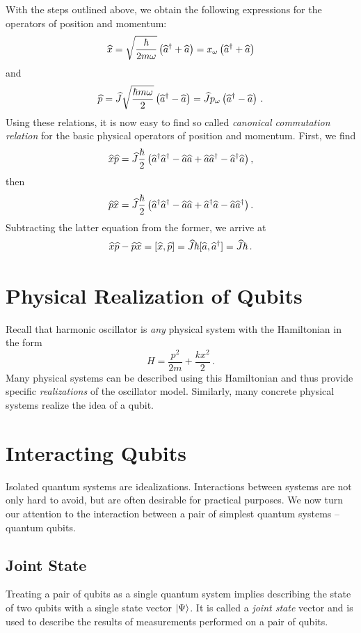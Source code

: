 With the steps outlined above, we obtain the following expressions for the operators of position and momentum:
\[
\widehat{x}=\sqrt{\frac{\hbar}{2m\omega}}\left(\widehat{a}^\dagger+\widehat{a}\right)=x_\omega\left(\widehat{a}^\dagger+\widehat{a}\right)
\]
and
\[
\widehat{p}=\widehat{J}\sqrt{\frac{\hbar m\omega}{2}}\left(\widehat{a}^\dagger-\widehat{a}\right)=\widehat{J} p_\omega\left(\widehat{a}^\dagger-\widehat{a}\right)\,.
\]
Using these relations, it is now easy to find so called \emph{canonical commutation relation} for the basic physical operators of position and momentum. First, we find
\[
\widehat{x}\widehat{p}=\widehat{J}\frac{\hbar}{2}\left(\widehat{a}^\dagger\widehat{a}^\dagger-\widehat{a}\widehat{a}+\widehat{a}\widehat{a}^\dagger-\widehat{a}^\dagger\widehat{a}\right),
\]
then
\[
\widehat{p}\widehat{x}=\widehat{J}\frac{\hbar}{2}\left(\widehat{a}^\dagger\widehat{a}^\dagger-\widehat{a}\widehat{a}+\widehat{a}^\dagger\widehat{a}-\widehat{a}\widehat{a}^\dagger\right).
\]
Subtracting the latter equation from the former, we arrive at
\[
\widehat{x}\widehat{p}-\widehat{p}\widehat{x}=\lbrack \widehat{x},\widehat{p}\rbrack=\widehat{J}\hbar\lbrack \widehat{a},\widehat{a}^\dagger\rbrack=\widehat{J}\hbar\,.
\]

\section{Physical Realization of Qubits}
Recall that harmonic oscillator is \emph{any} physical system with the Hamiltonian in the form
\[
H = \frac{p^2}{2m}+\frac{kx^2}{2}\,.
\] 
Many physical systems can be described using this Hamiltonian and thus provide specific \emph{realizations} of 
the oscillator model. Similarly, many concrete physical systems realize the idea of a qubit.

\section{Interacting Qubits}\label{sec:InteractingQubits}
Isolated quantum systems are idealizations. Interactions between systems are not only hard to  avoid, but are often desirable for practical purposes. We now turn our attention to the interaction between a pair of simplest quantum systems -- quantum qubits.

\subsection{Joint State}
Treating a pair of qubits as a single quantum system implies describing the state of two qubits with a single state vector $|{\Psi}\rangle$.  It is called a \emph{joint state} vector and is used to describe the results of  measurements performed on a pair of qubits.

